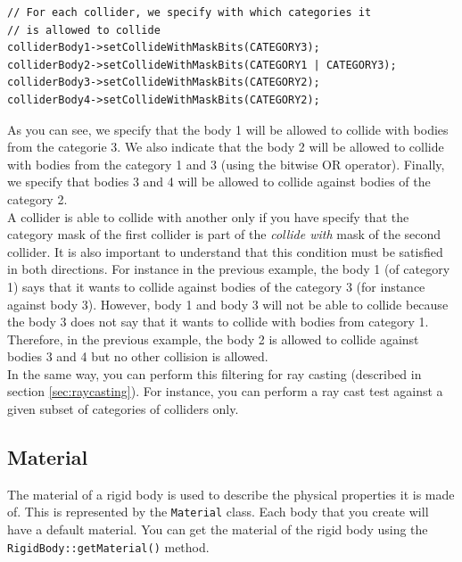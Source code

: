 \documentclass[a4paper,12pt]{article}
\begin{document}
    \begin{lstlisting}
// For each collider, we specify with which categories it
// is allowed to collide
colliderBody1->setCollideWithMaskBits(CATEGORY3);
colliderBody2->setCollideWithMaskBits(CATEGORY1 | CATEGORY3);
colliderBody3->setCollideWithMaskBits(CATEGORY2);
colliderBody4->setCollideWithMaskBits(CATEGORY2);
  \end{lstlisting}

    \vspace{0.6cm}

    As you can see, we specify that the body 1 will be allowed to collide with bodies from the categorie 3. We also indicate that the body 2 will be
    allowed to collide with bodies from the category 1 and 3 (using the bitwise OR operator). Finally, we specify that bodies 3 and 4 will be allowed
    to collide against bodies of the category 2. \\

    A collider is able to collide with another only if you have specify that the category mask of the first collider is part of the
    \emph{collide with} mask of the second collider. It is also important to understand that this condition must be satisfied in both directions. For
    instance in the previous example, the body 1 (of category 1) says that it wants to collide against bodies of the category 3 (for instance against
    body 3). However, body 1 and body 3 will not be able to collide because the body 3 does not say that it wants to collide
    with bodies from category 1. Therefore, in the previous example, the body 2 is allowed to collide against bodies 3 and 4 but no other collision
    is allowed. \\

    In the same way, you can perform this filtering for ray casting (described in section \ref{sec:raycasting}). For instance, you can perform a ray cast test
    against a given subset of categories of colliders only.

    \subsection{Material}
    \label{sec:material}

    The material of a rigid body is used to describe the physical properties it is made of. This is represented by the \texttt{Material} class. Each body that
    you create will have a default material. You can get the material of the rigid body using the \texttt{RigidBody::\allowbreak getMaterial()} method. \\
\end{document}
